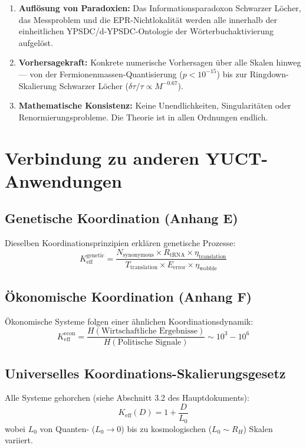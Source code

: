 \documentclass[12pt,a4paper]{article}
\theoremstyle{remark}
\newcommand{\Keff}{K_{\mathrm{eff}}}
\begin{document}
\begin{enumerate}
		\item \textbf{Auflösung von Paradoxien:} Das Informationsparadoxon Schwarzer Löcher, das Messproblem und die EPR-Nichtlokalität werden alle innerhalb der einheitlichen YPSDC/d-YPSDC-Ontologie der Wörterbuchaktivierung aufgelöst.
		
		\item \textbf{Vorhersagekraft:} Konkrete numerische Vorhersagen über alle Skalen hinweg — von der Fermionenmassen-Quantisierung ($p<10^{-15}$) bis zur Ringdown-Skalierung Schwarzer Löcher ($\delta\tau/\tau\propto M^{-0.67}$).
		
		\item \textbf{Mathematische Konsistenz:} Keine Unendlichkeiten, Singularitäten oder Renormierungsprobleme. Die Theorie ist in allen Ordnungen endlich.
	\end{enumerate}
	
	\section{Verbindung zu anderen YUCT-Anwendungen}
	\label{sec:connections}
	
	\subsection{Genetische Koordination (Anhang E)}
	
	Dieselben Koordinationsprinzipien erklären genetische Prozesse:
	\[
	K_{\text{eff}}^{\text{genetic}} = \frac{N_{\text{synonymous}} \times R_{\text{tRNA}} \times \eta_{\text{translation}}}{T_{\text{translation}} \times E_{\text{error}} \times \eta_{\text{wobble}}}
	\]
	
	\subsection{Ökonomische Koordination (Anhang F)}
	
	Ökonomische Systeme folgen einer ähnlichen Koordinationsdynamik:
	\[
	K_{\text{eff}}^{\text{econ}} = \frac{H(\text{Wirtschaftliche Ergebnisse})}{H(\text{Politische Signale})} \sim 10^3-10^6
	\]
	
	\subsection{Universelles Koordinations-Skalierungsgesetz}
	
	Alle Systeme gehorchen (siehe Abschnitt 3.2 des Hauptdokuments):
	\[
	\boxed{\Keff(D) = 1 + \frac{D}{L_0}}
	\]
	wobei $L_0$ von Quanten- ($L_0 \to 0$) bis zu kosmologischen ($L_0 \sim R_H$) Skalen variiert.
	
\end{document}
